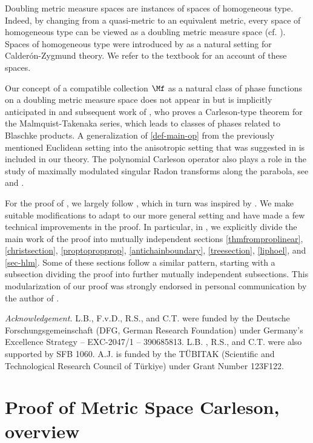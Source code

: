 Doubling metric measure spaces are instances of spaces of homogeneous type. Indeed, by changing from a quasi-metric to an equivalent metric, every space of homogeneous type can be viewed as a doubling metric measure space (cf. \cite{MaciasSegovia}). Spaces of homogeneous type were introduced by \cite{MR0499948} as a natural setting for Calder\'on-Zygmund theory. We refer to the textbook \cite{stein-book} for an account of these spaces.

Our concept of a compatible collection $\Mf$ as a natural class of phase functions on a doubling metric measure space does not appear in \cite{stein-book} but is implicitly anticipated in \cite{zk-polynomial} and subsequent work of \cite{mnatsakanyan}, who proves a Carleson-type theorem for the Malmquist-Takenaka series, which leads to classes of phases related to Blaschke products. A generalization of \eqref{def-main-op} from the previously mentioned Euclidean setting into the anisotropic setting that was suggested in \cite{zk-polynomial} is included in our theory. The polynomial Carleson operator also plays a role in the study of maximally modulated singular Radon transforms along the parabola, see \cite{ramos} and \cite{becker2024maximal}.

For the proof of , we largely follow \cite{zk-polynomial}, which in turn was inspired by \cite{lie-polynomial}. We make suitable modifications to adapt to our more general setting and have made a few technical improvements in the proof. In particular, in , we explicitly divide the main work of the proof into mutually independent sections \ref{thmfromproplinear}, \ref{christsection}, \ref{proptopropprop}, \ref{antichainboundary}, \ref{treesection}, \ref{liphoel}, and \ref{sec-hlm}. Some of these sections follow a similar pattern, starting with a subsection dividing the proof into further mutually independent subsections. This modularization of our proof was strongly endorsed in personal communication by the author of \cite{zk-polynomial}.

\noindent \textit{Acknowledgement.}
L.B., F.v.D., R.S., and C.T. were funded by the Deutsche Forschungsgemeinschaft (DFG, German Research Foundation) under Germany's Excellence Strategy -- EXC-2047/1 -- 390685813.
L.B. , R.S., and C.T. were also supported by SFB 1060.
A.J. is funded by the TÜBITAK (Scientific and Technological Research Council of Türkiye) under Grant Number 123F122.

\chapter{Proof of Metric Space Carleson, overview}
\label{overviewsection}

